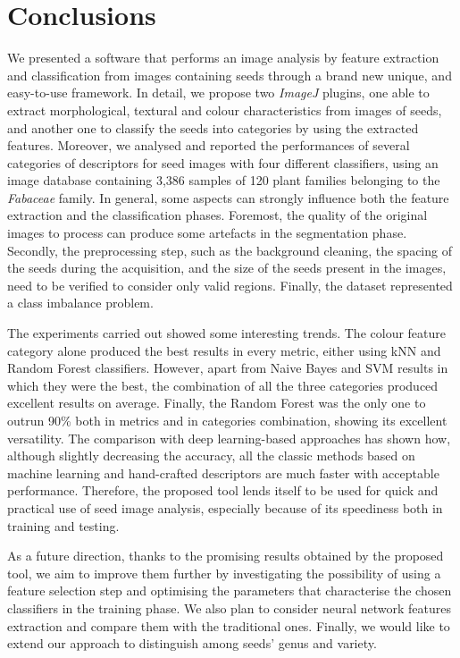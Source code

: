 \documentclass[twocolumn]{svjour3}           %
\begin{document}
\section{Conclusions}
\label{sec:conclusions}
We presented a software that performs an image analysis by feature extraction and classification from images containing seeds through a brand new unique, and easy-to-use framework. In detail, we propose two \emph{ImageJ} plugins, one able to extract morphological, textural and colour characteristics from images of seeds, and another one to classify the seeds into categories by using the extracted features. 
Moreover, we analysed and reported the performances of several categories of descriptors for seed images with four different classifiers, using an image database containing 3,386 samples of 120 plant families belonging to the \emph{Fabaceae} family. 
In general, some aspects can strongly influence both the feature extraction and the classification phases. Foremost, the quality of the original images to process can produce some artefacts in the segmentation phase. Secondly, the preprocessing step, such as the background cleaning, the spacing of the seeds during the acquisition, and the size of the seeds present in the images, need to be verified to consider only valid regions. Finally, the dataset represented a class imbalance problem.

The experiments carried out showed some interesting trends. The colour feature category alone produced the best results in every metric, either using kNN and Random Forest classifiers. However, apart from Naive Bayes and SVM results in which they were the best, the combination of all the three categories produced excellent results on average. Finally, the Random Forest was the only one to outrun 90\% both in metrics and in categories combination, showing its excellent versatility.
The comparison with deep learning-based approaches has shown how, although slightly decreasing the accuracy, all the classic methods based on machine learning and hand-crafted descriptors are much faster with acceptable performance. Therefore, the proposed tool lends itself to be used for quick and practical use of seed image analysis, especially because of its speediness both in training and testing.

As a future direction, thanks to the promising results obtained by the proposed tool, we aim to improve them further by investigating the possibility of using a feature selection step and optimising the parameters that characterise the chosen classifiers in the training phase. We also plan to consider neural network features extraction and compare them with the traditional ones. 
Finally, we would like to extend our approach to distinguish among seeds' genus and variety.
\end{document}
